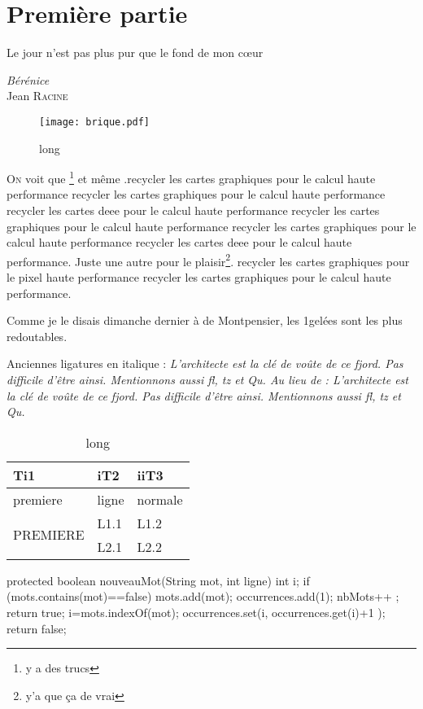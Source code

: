 \section{Première partie}
\epigraph{Le jour n'est pas plus pur que le fond de mon cœur}{\emph{Bérénice}\\ Jean \textsc{Racine}}
\label{sec:pp}
\begin{figure}[hbtp]
\texttt{[image: brique.pdf]}
\label{fig:birque}
\caption[short]{long}
\end{figure}
\lettrine[lines=3, lhang=0.2, loversize=0.33, slope=0.0em, findent=0.0em, nindent=0.3em]{O}{n} voit que \footnote{y a des trucs} et même .recycler les cartes graphiques pour le calcul haute performance recycler les cartes graphiques pour le calcul haute performance \cite{gpgpu} recycler les cartes \gls{deee} pour le calcul haute performance recycler les cartes graphiques pour le calcul haute performance recycler les cartes graphiques pour le calcul haute performance recycler les cartes \gls{deee} pour le calcul haute performance. Juste une autre pour le plaisir\footnote{y'a que ça de vrai}. recycler les cartes graphiques pour le \gls{pixel} haute performance recycler les cartes graphiques pour le calcul haute performance. 

Comme je le disais dimanche dernier à \madame de Montpensier, les 1\ieres gelées sont les plus redoutables.

Anciennes ligatures en italique : \itshape{L'architecte est la clé de voûte de ce fjord. Pas difficile d'être ainsi. Mentionnons aussi fl, tz et Qu.} Au lieu de : L'architecte est la clé de voûte de ce fjord. Pas difficile d'être ainsi. Mentionnons aussi fl, tz et Qu.

\begin{table}[ht]
\centering
\begin{tabular}{|l|l|l|}
\hline
{\bfseries Ti1} & {\bfseries iT2} & {\bfseries iiT3} \tabularnewline
\hline
premiere & ligne & normale \tabularnewline
\hline
\multirow{2}{*}{PREMIERE}
& L1.1 & L1.2 \tabularnewline
& L2.1 & L2.2 \tabularnewline
\hline
\end{tabular}
\label{tab:suicide}
\caption[short]{long}
\end{table}
\vspace{1.5cm}
\label{1nm}
\begin{java}[label=1nm]
protected boolean nouveauMot(String mot, int ligne) {
	int i;
	if (mots.contains(mot)==false)	{
		mots.add(mot); 
		occurrences.add(1);
		nbMots++ ;
		return true;
	}
	i=mots.indexOf(mot);
	occurrences.set(i, occurrences.get(i)+1 );
	return false;
}
\end{java}

